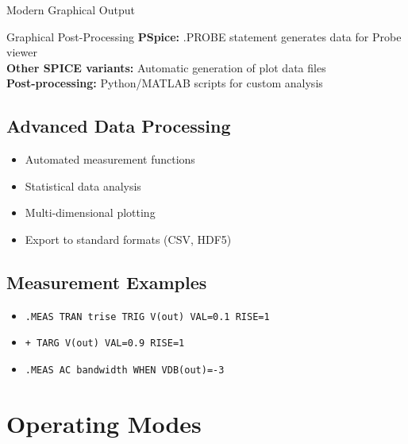\documentclass{beamer}
\begin{document}
\begin{frame}{Modern Graphical Output}
    \begin{alertblock}{Graphical Post-Processing}
        \textbf{PSpice:} .PROBE statement generates data for Probe viewer \\
        \textbf{Other SPICE variants:} Automatic generation of plot data files \\
        \textbf{Post-processing:} Python/MATLAB scripts for custom analysis
    \end{alertblock}
    
    \subsection{Advanced Data Processing}
    \begin{itemize}
        \item Automated measurement functions
        \item Statistical data analysis
        \item Multi-dimensional plotting
        \item Export to standard formats (CSV, HDF5)
    \end{itemize}
    
    \subsection{Measurement Examples}
    \begin{itemize}
        \item \texttt{.MEAS TRAN trise TRIG V(out) VAL=0.1 RISE=1}
        \item \texttt{+ TARG V(out) VAL=0.9 RISE=1}
        \item \texttt{.MEAS AC bandwidth WHEN VDB(out)=-3}
    \end{itemize}
\end{frame}

\section{Operating Modes}
\end{document}
